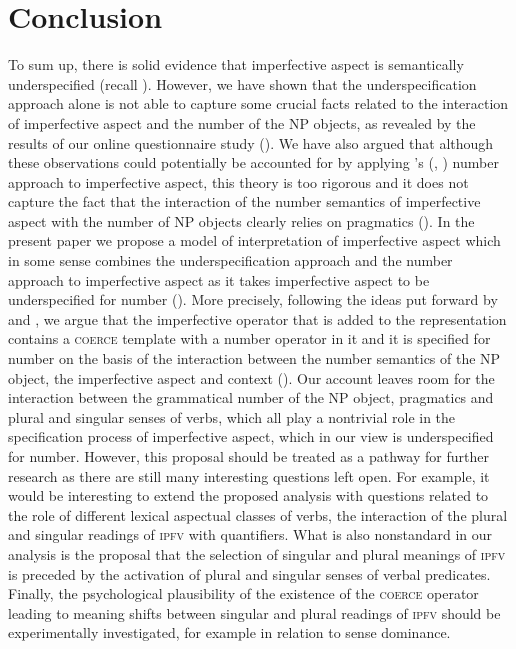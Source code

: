 \documentclass[output=paper]{langscibook}
\begin{document}
\section{Conclusion}\label{jan-bla:fansb:kb:sec6}

To sum up, there is solid evidence that imperfective aspect is semantically underspecified (recall ). However, we have shown that the underspecification approach alone is not able to capture some crucial facts related to the interaction of imperfective aspect and the number of the NP objects, as revealed by the results of our online questionnaire study (). We have also argued that although these observations could potentially be accounted for by applying \citeauthor{Ferreira2004}'s (\citeyear{Ferreira2004}, \citeyear{Ferreira2005}) number approach to imperfective aspect, this theory is too rigorous and it does not capture the fact that the interaction of the number semantics of imperfective aspect with the number of NP objects clearly relies on pragmatics (). In the present paper we propose a model of interpretation of imperfective aspect which in some sense combines the underspecification approach and the number approach to imperfective aspect as it takes imperfective aspect to be underspecified for number (). More precisely, following the ideas put forward by \citet{Dolling2003a,Dolling2003b,Dolling2014} and \citet{Egg2005}, we argue that the imperfective operator that is added to the representation contains a \textsc{coerce} template with a number operator in it and it is specified for number on the basis of the interaction between the number semantics of the NP object, the imperfective aspect and context (). Our account leaves room for the interaction between the grammatical number of the NP object, pragmatics and plural and singular senses of verbs, which all play a nontrivial role in the specification process of imperfective aspect, which in our view is underspecified for number. However, this proposal should be treated as a pathway for further research as there are still many interesting questions left open. For example, it would be interesting to extend the proposed analysis with questions related to the role of different lexical aspectual classes of verbs, the interaction of the plural and singular readings of \textsc{ipfv} with quantifiers. What is also nonstandard in our analysis is the proposal that the selection of singular and plural meanings of \textsc{ipfv} is preceded by the activation of plural and singular senses of verbal predicates. Finally, the psychological plausibility of the existence of the \textsc{coerce} operator leading to meaning shifts between singular and plural readings of \textsc{ipfv} should be experimentally investigated, for example in relation to sense dominance. 
\end{document}
